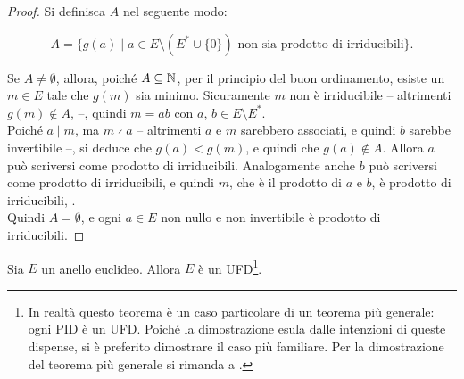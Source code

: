\documentclass[11pt]{scrbook}
\begin{document}
\begin{proof}
    Si definisca $A$ nel seguente modo:

    \[A = \{g(a) \mid a \in E \setminus (E^* \cup \{0\}) \text{ non sia prodotto di irriducibili}\}.\]

    \vskip 0.1in

    Se $A \neq \emptyset$, allora, poiché $A \subseteq \mathbb N$, per il principio
    del buon ordinamento, esiste un $m \in E$ tale che $g(m)$ sia minimo.
    Sicuramente $m$ non è irriducibile -- altrimenti $g(m) \notin A$, \Lightning{} --,
    quindi $m=ab$ con $a$, $b \in E \setminus E^*$. \\

    Poiché $a \mid m$, ma $m \nmid a$ -- altrimenti $a$ e $m$ sarebbero
    associati, e quindi $b$ sarebbe invertibile --, si deduce che $g(a) < g(m)$, e
    quindi che $g(a) \notin A$. Allora $a$ può scriversi come prodotto di irriducibili.
    Analogamente anche $b$ può scriversi come prodotto di irriducibili, e quindi
    $m$, che è il prodotto di $a$ e $b$, è prodotto di irriducibili, \Lightning{}. \\

    Quindi $A = \emptyset$, e ogni $a \in E$ non nullo e non invertibile è prodotto
    di irriducibili.
\end{proof}

\begin{theorem}
    \label{th:euclidei_ufd}
    Sia $E$ un anello euclideo. Allora $E$ è un UFD\footnote{In realtà questo teorema
        è un caso particolare di un teorema più generale: ogni PID è un UFD. Poiché
        la dimostrazione esula dalle intenzioni di queste dispense, si è preferito
        dimostrare il caso più familiare. Per la dimostrazione del teorema più generale si
        rimanda a \cite[pp.~124-126]{di2013algebra}.}.
\end{theorem}
\end{document}
